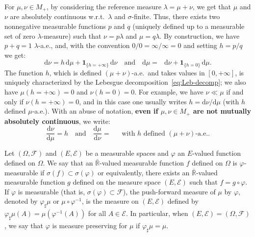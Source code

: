 \documentclass[12pt]{article}
\newcommand{\ce}{{\mathcal E}}
\newcommand{\cf}{{\mathcal F}}
\newcommand{\R}{{\mathbb R}}
\newcommand{\inv}[1]{\mathop{\frac{1}{#1}}\nolimits}
\newcommand{\ind}{\mathbf{1}}
\newcommand{\rd}{\mathrm{d}}
\theoremstyle{plain}
\theoremstyle{remark}
\begin{document}
For   $\mu,  \nu\in   M_+$,   by  considering   the  reference   measure
$\lambda=\mu  +\nu$, we get that  $\mu$  and $\nu$  are absolutely  continuous
w.r.t.\  $\lambda$ and  $\sigma$-finite. Thus, there  exists two  nonnegative
measurable functions  $p$ and $q$  (uniquely defined up to  a measurable
set   of   zero   $\lambda$-measure)  such   that   $\nu=p\lambda$   and
$\mu=q \lambda$. By construction, we have  $p+q=1$ $\lambda$-a.e., and, with the convention
$0/0=\infty /\infty =0$ and setting $h=p/q$ we get:
\begin{equation}
  \label{eq:Leb-decomp}
  \rd \nu = h \, \rd \mu + \ind_{\{h=+\infty \}}\, \rd \nu
  \quad\text{and}\quad
  \rd \mu = \inv{h} \, \rd \nu + \ind_{\{h=0 \}}\, \rd \mu.
\end{equation}
The function $h$, which is   defined $(\mu+\nu)$-a.e.\ and takes values
in $[0, +\infty ]$, is uniquely
characterized by the Lebesgue decomposition~\eqref{eq:Leb-decomp}; we
also have  $\mu(h=+\infty )=0
$ and $\nu(h=0)=0$.
For example, we have $\nu \ll \mu$ if
and only if $\nu(h=+\infty )=0$, and in this case one usually writes $h=
\rd \nu/ \rd \mu$ (with $h$ defined $\mu$-a.e.).
With an  abuse  of
notation, \textbf{even if $\mu, \nu\in  M_+$ are not mutually absolutely
  continuous}, we write:
\begin{equation}
  \label{eq:Leb-dd2}
  \frac{\rd \nu}{\rd \mu}= h
  \quad\text{and}\quad
  \frac{\rd \mu}{\rd \nu}=\inv{  h}
  \quad \text{with $h$ defined $(\mu+\nu)$-a.e..}
\end{equation}

\medskip


Let $(\Omega, \cf)$  and $(E, \ce)$ be a measurable  spaces and $\varphi$
an  $E$-valued   function  defined  on  $\Omega$.    We  say
that an $\bar \R$-valued measurable  function $f$ defined on $\Omega$ is
$\varphi$-measurable   if   $\sigma(f)   \subset   \sigma(\varphi)$   or
equivalently, there  exists an $\bar \R$-valued  measurable function $g$
defined on  the measure space  $(E,\ce)$ such that $f=g  \circ \varphi$.
If $\varphi$ is measurable (that is, $\sigma(\varphi) \subset \cf$), the
push-forward    measure   of    $\mu$   by    $\varphi$,   denoted    by
$\varphi_\sharp  \mu$  or $\mu\circ  \varphi^{-1}$,  is  the measure  on
$(E, \ce)$ defined by  $\varphi_\sharp \mu(A)=\mu (\varphi^{-1}(A))$ for
all $A\in  \ce$. In particular, when $(E, \ce)=(\Omega, \cf)$, we say that $\varphi$ is measure
preserving for $\mu$ if $\varphi_\sharp \mu=\mu$.
\end{document}
